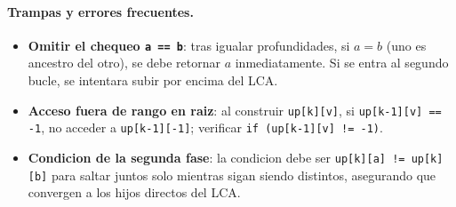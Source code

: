 \paragraph{Trampas y errores frecuentes.}
\begin{itemize}\setlength\itemsep{0pt}
	\item \textbf{Omitir el chequeo \texttt{a == b}}: tras igualar profundidades, si $a = b$ (uno es ancestro del otro), se debe retornar $a$ inmediatamente. Si se entra al segundo bucle, se intentara subir por encima del LCA.
	\item \textbf{Acceso fuera de rango en raiz}: al construir \texttt{up[k][v]}, si \texttt{up[k-1][v] == -1}, no acceder a \texttt{up[k-1][-1]}; verificar \verb|if (up[k-1][v] != -1)|.
	\item \textbf{Condicion de la segunda fase}: la condicion debe ser \verb|up[k][a] != up[k][b]| para saltar juntos solo mientras sigan siendo distintos, asegurando que convergen a los hijos directos del LCA.
\end{itemize}

